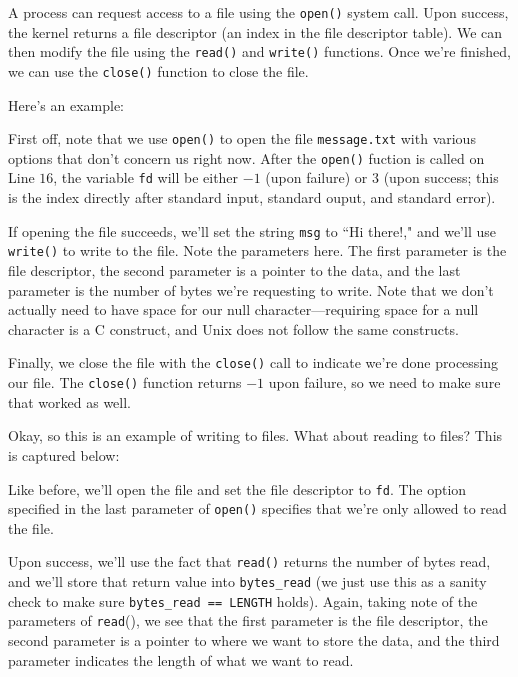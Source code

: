 A process can request access to a file using the \verb!open()! system call. Upon success, the kernel returns a file descriptor (an index in the file descriptor table). We can then modify the file using the \verb!read()! and \verb!write()! functions. Once we're finished, we can use the \verb!close()! function to close the file.


Here's an example:


\lstset{caption=Unix I/O Example 1}
\begin{center}

\end{center}


First off, note that we use \verb!open()! to open the file \verb!message.txt! with various options that don't concern us right now. After the \verb!open()! fuction is called on Line $16$, the variable \verb!fd! will be either $-1$ (upon failure) or $3$ (upon success; this is the index directly after standard input, standard ouput, and standard error). 

If opening the file succeeds, we'll set the string \verb!msg! to ``Hi there!," and we'll use \verb!write()! to write to the file. Note the parameters here. The first parameter is the file descriptor, the second parameter is a pointer to the data, and the last parameter is the number of bytes we're requesting to write. Note that we don't actually need to have space for our null character---requiring space for a null character is a C construct, and Unix does not follow the same constructs.


Finally, we close the file with the \verb!close()! call to indicate we're done processing our file. The \verb!close()! function returns $-1$ upon failure, so we need to make sure that worked as well. 


Okay, so this is an example of writing to files. What about reading to files? This is captured below: 


\lstset{caption=Unix I/O Example 2}
\begin{center}

\end{center}

Like before, we'll open the file and set the file descriptor to \verb!fd!. The option specified in the last parameter of \verb!open()! specifies that we're only allowed to read the file. 

Upon success, we'll use the fact that \verb!read()! returns the number of bytes read, and we'll store that return value into \verb!bytes_read! (we just use this as a sanity check to make sure \verb!bytes_read == LENGTH! holds). Again, taking note of the parameters of \verb!read!(), we see that the first parameter is the file descriptor, the second parameter is a pointer to where we want to store the data, and the third parameter indicates the length of what we want to read.

